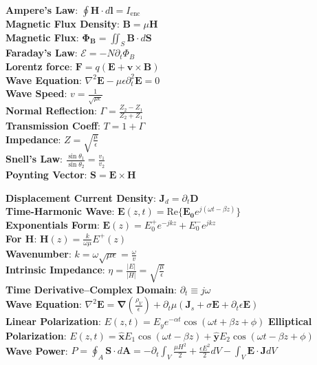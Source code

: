 \documentclass[12pt]{article}
\begin{document}
\begin{multicols}{3}
  \textbf{Ampere's Law}: $\oint \mathbf{H} \cdot d\mathbf{l} = I_{\text{enc}}$ \\
  \textbf{Magnetic Flux Density}: $\mathbf{B} = \mu \mathbf{H}$ \\
  \textbf{Magnetic Flux}: $\mathbf{\Phi_B} = \iint_S \mathbf{B}\cdot d\mathbf{S}$ \\
  \textbf{Faraday's Law}: $\mathcal{E} = -N\partial_t\Phi_B$ \\
  \textbf{Lorentz force}: $\mathbf{F}=q(\mathbf{E}+\mathbf{v} \times \mathbf{B})$ \\
  \textbf{Wave Equation}: $\nabla^2 \mathbf{E} - \mu \epsilon \partial^2_t \mathbf{E} = 0$ \\
  \textbf{Wave Speed}: $v = \frac{1}{\sqrt{\mu \epsilon}}$ \\
  \textbf{Normal Reflection}: $\Gamma = \frac{Z_2 - Z_1}{Z_2 + Z_1}$ \\
  \textbf{Transmission Coeff}: $T = 1 + \Gamma$ \\
  \textbf{Impedance}: $Z = \sqrt{\frac{\mu}{\epsilon}}$ \\
  \textbf{Snell's Law}: $\frac{\sin \theta_1}{\sin \theta_2} = \frac{v_1}{v_2}$ \\
  \textbf{Poynting Vector}: \(\mathbf{S} = \mathbf{E}\times \mathbf{H}\)
\end{multicols}
\vspace*{-2em}
\begin{multicols}{2}
  \textbf{Displacement Current Density}: $\mathbf{J}_d = \partial_t \mathbf{D}$ \\
  \textbf{Time-Harmonic Wave}: $\mathbf{E}(z,t) = \text{Re}\{\mathbf{E_0}e^{j(\omega t - \beta z)}\}$ \\
  \textbf{Exponentials Form}: $\mathbf{E}(z) = E_{0}^+e^{-jkz} + E_{0}^-e^{jkz} $ \\
  \textbf{For H}: $\mathbf{H}(z) = \frac{k}{\omega \mu }E^+(z)$ \\
  \textbf{Wavenumber}: $k = \omega\sqrt{\mu\epsilon} = \frac{\omega}{v}$ \\
  \textbf{Intrinsic Impedance}: $\eta = \frac{|E|}{|H|} = \sqrt{\frac{\mu}{\epsilon}}$ \\
  \textbf{Time Derivative--Complex Domain}: $\partial_t \equiv j\omega$ \\
  \textbf{Wave Equation}: $\nabla^2 \mathbf{E} = \boldsymbol\nabla(\frac{\rho _V}{\epsilon}) + \partial_t \mu (\mathbf{J}_s+\sigma \mathbf{E}+\partial_t \epsilon \mathbf{E})$ \\
  \textbf{Linear Polarization}: $E(z,t)=E_{y}e^{-\alpha t}\cos (\omega t + \beta z + \phi)$
  \textbf{Elliptical Polarization}: $E(z,t)=\mathbf{\hat x}E_{1}\cos (\omega t-\beta z)+\mathbf{\hat{y}}E_{2}\cos (\omega t-\beta z+\phi ) $ \\
  \textbf{Wave Power}: $P = \oint_A \mathbf{S}\cdot d\mathbf{A} = -\partial_t \int_V \frac{\mu H^2}{2}+\frac{\epsilon E^2}{2}dV - \int_V \mathbf{E}\cdot \mathbf{J} dV$
\end{multicols}
\end{document}

